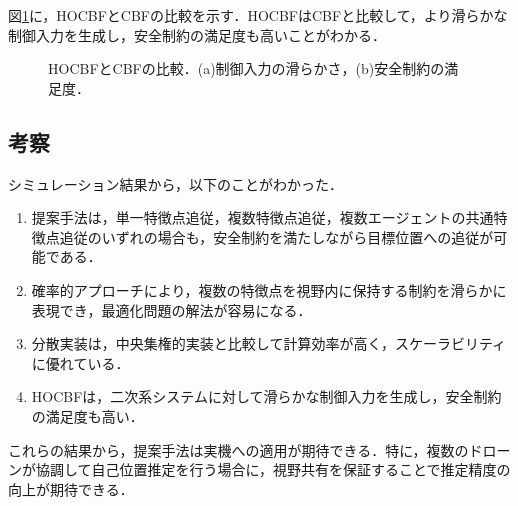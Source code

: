 図\ref{fig:hocbf_vs_cbf}に，HOCBFとCBFの比較を示す．HOCBFはCBFと比較して，より滑らかな制御入力を生成し，安全制約の満足度も高いことがわかる．

\begin{figure}[htbp]
    \centering
    \caption{HOCBFとCBFの比較．(a)制御入力の滑らかさ，(b)安全制約の満足度．}
    \label{fig:hocbf_vs_cbf}
\end{figure}

\subsection{考察}

シミュレーション結果から，以下のことがわかった．

\begin{enumerate}
    \item 提案手法は，単一特徴点追従，複数特徴点追従，複数エージェントの共通特徴点追従のいずれの場合も，安全制約を満たしながら目標位置への追従が可能である．
    \item 確率的アプローチにより，複数の特徴点を視野内に保持する制約を滑らかに表現でき，最適化問題の解法が容易になる．
    \item 分散実装は，中央集権的実装と比較して計算効率が高く，スケーラビリティに優れている．
    \item HOCBFは，二次系システムに対して滑らかな制御入力を生成し，安全制約の満足度も高い．
\end{enumerate}

これらの結果から，提案手法は実機への適用が期待できる．特に，複数のドローンが協調して自己位置推定を行う場合に，視野共有を保証することで推定精度の向上が期待できる．
